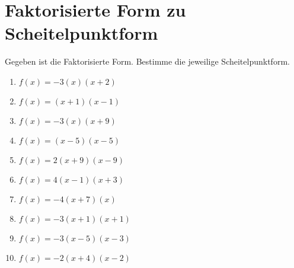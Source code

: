 \documentclass{article}%
\begin{document}
\section{Faktorisierte Form zu Scheitelpunktform}%
\label{sec:FaktorisierteFormzuScheitelpunktform}%
Gegeben ist die Faktorisierte Form. Bestimme die jeweilige Scheitelpunktform.%
\begin{enumerate}[label=\alph*)]%
\item%
\newline\vspace{0.5cm} $f(x)=-3(x)(x+2)$%
\item%
\newline\vspace{0.5cm} $f(x)=(x+1)(x-1)$%
\item%
\newline\vspace{0.5cm} $f(x)=-3(x)(x+9)$%
\item%
\newline\vspace{0.5cm} $f(x)=(x-5)(x-5)$%
\item%
\newline\vspace{0.5cm} $f(x)=2(x+9)(x-9)$%
\item%
\newline\vspace{0.5cm} $f(x)=4(x-1)(x+3)$%
\item%
\newline\vspace{0.5cm} $f(x)=-4(x+7)(x)$%
\item%
\newline\vspace{0.5cm} $f(x)=-3(x+1)(x+1)$%
\item%
\newline\vspace{0.5cm} $f(x)=-3(x-5)(x-3)$%
\item%
\newline\vspace{0.5cm} $f(x)=-2(x+4)(x-2)$%
\end{enumerate}

%
\end{document}
